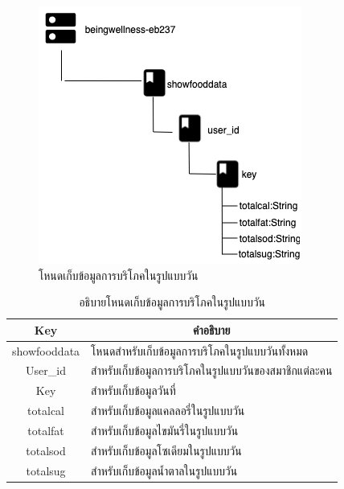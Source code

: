 \newpage
\begin{figure}[H]
	\centering
	\includegraphics[width=0.6\columnwidth]
	{Figures/3/DB/showfooddata.png}
	\caption{โหนดเก็บข้อมูลการบริโภคในรูปแบบวัน}
	\label{Fig:DB4}
\end{figure}
\begin{table}[H]
	\centering
	\caption{อธิบายโหนดเก็บข้อมูลการบริโภคในรูปแบบวัน}
	\label{my-label1}
	\begin{tabular}{|c|p{10cm}|}
		\hline
		\multicolumn{1}{|c|}{\textbf{Key}} & \multicolumn{1}{c|}{\textbf{คำอธิบาย}} \\ \hline
		showfooddata & โหนดสำหรับเก็บข้อมูลการบริโภคในรูปแบบวันทั้งหมด\\ \hline
		User\_id &  สำหรับเก็บข้อมูลการบริโภคในรูปแบบวันของสมาชิกแต่ละคน \\ \hline
		Key & สำหรับเก็บข้อมูลวันที่ \\ \hline
		totalcal & สำหรับเก็บข้อมูลแคลลอรี่ในรูปแบบวัน \\ \hline
		totalfat & สำหรับเก็บข้อมูลไขมันรี่ในรูปแบบวัน \\ \hline
		totalsod & สำหรับเก็บข้อมูลโซเดียมในรูปแบบวัน\\ \hline
		totalsug & สำหรับเก็บข้อมูลน้ำตาลในรูปแบบวัน\\ \hline
	
	\end{tabular}
\end{table}

